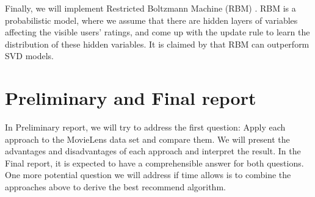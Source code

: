 \documentclass[bj, preprint]{imsart}
\begin{document}
Finally, we will implement Restricted Boltzmann Machine (RBM) \cite{10.1145/1273496.1273596}. RBM is a probabilistic model, where we assume that there are hidden layers of variables affecting the visible users' ratings, and come up with the update rule to learn the distribution of these hidden variables. It is claimed by \cite{10.1145/1273496.1273596} that RBM can outperform SVD models. 


\section{Preliminary and Final report}\label{sec:report}
In Preliminary report, we will try to address the first question: Apply each approach to the MovieLens data set and compare them. We will present the advantages and disadvantages of each approach and interpret the result. In the Final report, it is expected to have a comprehensible answer for both questions. One more potential question we will address if time allows is to combine the approaches above to derive the best recommend algorithm. 


{}
\end{document}
